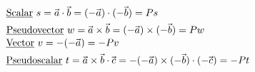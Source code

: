 \documentclass{article}
\newcommand{\hsvec}[1]{\hspace{-1pt}\vec{\hspace{1pt} #1}} %
\begin{document}
%
%
%
\newpage

\(
    \begin{aligned}
        & \underline{\text{Scalar}}\ s = \hsvec{a} \cdot \hsvec{b} = (-\hsvec{a}) \cdot (-\hsvec{b}) = Ps\\
        & \underline{\text{Pseudovector}}\ w = \hsvec{a} \times \hsvec{b} = (-\hsvec{a}) \times (-\hsvec{b}) = Pw
    \end{aligned}
\)
\hspace{15pt}
\(
    \begin{aligned}
        & \underline{\text{Vector}}\ v = -(-\hsvec{a}) = -Pv\\
        & \underline{\text{Pseudoscalar}}\ t = \hsvec{a} \times \hsvec{b} \cdot \hsvec{c} 
            = - (-\hsvec{a}) \times (-\hsvec{b}) \cdot (-\hsvec{c}) = -Pt
    \end{aligned}
\)
\end{document}
